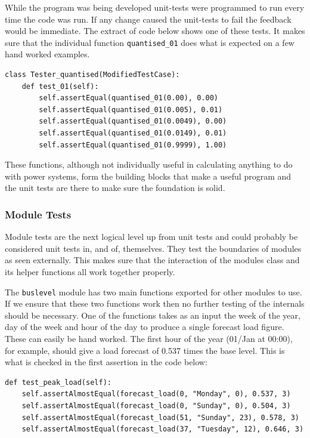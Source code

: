 \documentclass[a4paper,oneside,12pt]{report}
\begin{document}
While the program was being developed unit-tests were programmed to run every time the code was run. If any change caused the unit-tests to fail the feedback would be immediate. The extract of code below shows one of these tests. It makes sure that the individual function \texttt{quantised\_01} does what is expected on a few hand worked examples.

\begin{verbatim}
class Tester_quantised(ModifiedTestCase):
    def test_01(self):
        self.assertEqual(quantised_01(0.00), 0.00)
        self.assertEqual(quantised_01(0.005), 0.01)
        self.assertEqual(quantised_01(0.0049), 0.00)
        self.assertEqual(quantised_01(0.0149), 0.01)
        self.assertEqual(quantised_01(0.9999), 1.00)
\end{verbatim}

These functions, although not individually useful in calculating anything
to do with power systems, form the building blocks that make a useful
program and the unit tests are there to make sure the foundation is
solid.

\subsubsection{Module Tests}

Module tests are the next logical level up from unit tests and could
probably be considered unit tests in, and of, themselves. They test the
boundaries of modules as seen externally. This makes sure that the
interaction of the modules class and its helper functions all work
together properly.

The \texttt{buslevel} module has two main functions exported
for other modules to use. If we ensure that these two functions work
then no further testing of the internals should be necessary. One of
the functions takes as an input the week of the year, day of the week
and hour of the day to produce a single forecast load figure. These can
easily be hand worked. The first hour of the year (01/Jan
at 00:00), for example, should give a load forecast of 0.537 times the base level.
This is what is checked in the first assertion in the code below:

\begin{verbatim}
def test_peak_load(self):
    self.assertAlmostEqual(forecast_load(0, "Monday", 0), 0.537, 3)
    self.assertAlmostEqual(forecast_load(0, "Sunday", 0), 0.504, 3)
    self.assertAlmostEqual(forecast_load(51, "Sunday", 23), 0.578, 3)
    self.assertAlmostEqual(forecast_load(37, "Tuesday", 12), 0.646, 3)
\end{verbatim}
\end{document}
